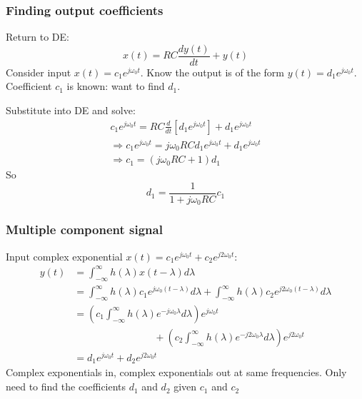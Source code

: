 \documentclass[10pt]{beamer}
\begin{document}
\begin{frame}
  \frametitle{Finding output coefficients}
  Return to DE:
  \begin{equation*}
    x(t) = RC \frac{dy(t)}{dt} + y(t)
  \end{equation*}
  Consider input $x(t) = c_1 e^{j \omega_0 t}$.  Know the output
  is of the form $y(t) = d_1 e^{j \omega_0 t}$.  Coefficient $c_1$
  is known: want to find $d_1$.

  Substitute into DE and solve:
  \begin{gather*}
    c_1 e^{j \omega_0 t} = RC \frac{d}{dt} \left[ d_1 e^{j \omega_0 t}
    \right] + d_1 e^{j \omega_0 t} \\
    \Longrightarrow
    c_1 e^{j \omega_0 t} = j \omega_0 RC d_1 e^{j \omega_0 t}
    + d_1 e^{j \omega_0 t} \\
    \Longrightarrow
    c_1 = (j \omega_0 RC + 1) d_1
  \end{gather*}
  So
  \begin{equation*}
    d_1 = \frac{1}{1 + j \omega_0 RC} c_1
  \end{equation*}

\end{frame}

\begin{frame}
  \frametitle{Multiple component signal}
  Input complex exponential $x(t) = c_1 e^{j \omega_0 t}
  + c_2 e^{j 2 \omega_0 t}$:
  \begin{align*}
    y(t) &= \int_{-\infty}^{\infty} h(\lambda) x(t-\lambda)
    d\lambda \\
    &= \int_{-\infty}^{\infty} h(\lambda)
    c_1 e^{j \omega_0 (t-\lambda)} d\lambda +
    \int_{-\infty}^{\infty} h(\lambda)
    c_2 e^{j 2 \omega_0 (t-\lambda)} d\lambda \\
    &= \left( c_1 \int_{-\infty}^{\infty} h(\lambda)
    e^{-j \omega_0 \lambda} d\lambda \right) e^{j \omega_0 t} \\
    &\qquad \qquad \qquad \qquad +
    \left( c_2 \int_{-\infty}^{\infty} h(\lambda)
    e^{-j 2 \omega_0 \lambda} d\lambda \right) e^{j 2 \omega_0 t}
    \\
    &= d_1 e^{j \omega_0 t} + d_2 e^{j 2 \omega_0 t}
  \end{align*}
  Complex exponentials in, complex exponentials out at same
  frequencies.  Only need to find the coefficients $d_1$ and $d_2$
  given $c_1$ and $c_2$
\end{frame}
\end{document}
